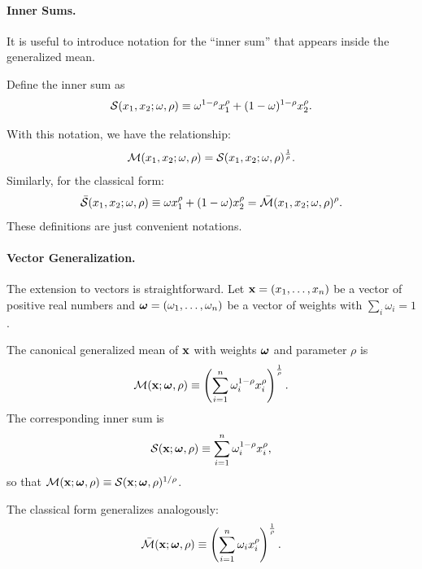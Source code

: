 \paragraph{Inner Sums.}

It is useful to introduce notation for the ``inner sum'' that appears inside the generalized mean.

\begin{definition}
\label{def:inner-sum}
Define the inner sum as
\begin{equation}
\label{eq:inner-sum}
\mathcal{S}(x_1, x_2; \omega, \rho) \equiv \omega^{1-\rho} x_1^\rho + (1-\omega)^{1-\rho} x_2^\rho.
\end{equation}
\end{definition}
With this notation, we have the relationship:
\begin{equation}
\label{eq:mean-from-sum}
\mathcal{M}(x_1, x_2; \omega, \rho) = \mathcal{S}(x_1, x_2; \omega, \rho)^{\frac{1}{\rho}}.
\end{equation}
Similarly, for the classical form:
\begin{equation}
\bar{\mathcal{S}}(x_1, x_2; \omega, \rho) \equiv \omega x_1^\rho + (1-\omega) x_2^\rho = \bar{\mathcal{M}}(x_1, x_2; \omega, \rho)^\rho.
\end{equation}
These definitions are just convenient notations.
\paragraph{Vector Generalization.}

The extension to vectors is straightforward. Let $\mathbf{x} = (x_1, \ldots, x_n)$ be a vector of positive real numbers and $\boldsymbol{\omega} = (\omega_1, \ldots, \omega_n)$ be a vector of weights with $\sum_i \omega_i = 1$.

\begin{definition}
\label{def:vector-mean}
The canonical generalized mean of $\mathbf{x}$ with weights $\boldsymbol{\omega}$ and parameter $\rho$ is
\begin{equation*}
\label{eq:vector-mean}
\mathcal{M}(\mathbf{x}; \boldsymbol{\omega}, \rho) \equiv \left( \sum_{i=1}^n \omega_i^{1-\rho} x_i^\rho \right)^{\frac{1}{\rho}}.
\end{equation*}
The corresponding inner sum is
\begin{equation*}
\mathcal{S}(\mathbf{x}; \boldsymbol{\omega}, \rho) \equiv \sum_{i=1}^n \omega_i^{1-\rho} x_i^\rho,
\end{equation*}
so that $\mathcal{M}(\mathbf{x}; \boldsymbol{\omega}, \rho) \equiv \mathcal{S}(\mathbf{x}; \boldsymbol{\omega}, \rho)^{1/\rho}$.
\end{definition} 
The classical form generalizes analogously:
\begin{equation*}
\bar{\mathcal{M}}(\mathbf{x}; \boldsymbol{\omega}, \rho) \equiv \left( \sum_{i=1}^n \omega_i x_i^\rho \right)^{\frac{1}{\rho}}.
\end{equation*}

